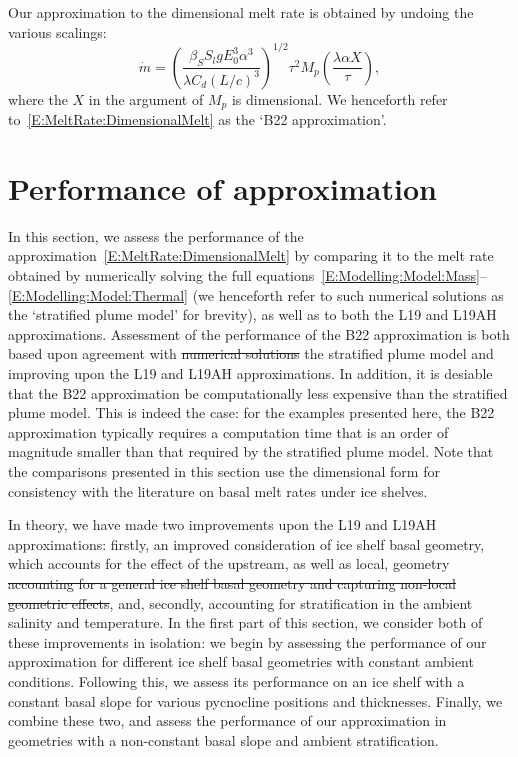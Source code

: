 \documentclass[openacc]{rsproca_new}%
\newcommand{\red}[1]{{\color{red} #1}}
\newcommand{\blue}[1]{{\color{blue} #1}}
\newcommand{\rout}[1]{\red{\st{#1}}}\newcommand{\ab}[1]{\textcolor{Green}{#1}}\newcommand{\about}[1]{\textcolor{Cyan}{\sout{#1}}}
\begin{document}
Our approximation to the dimensional melt rate is obtained by undoing the various scalings:
\begin{equation}\label{E:MeltRate:DimensionalMelt}
\dot{m} =\left(\frac{\beta_S S_l g  E_0^3 \alpha^3}{\lambda C_d (L/c)^3}\right)^{1/2} \tau^2  M_p\left(\frac{\lambda \alpha X}{\tau}\right),
\end{equation}
where the $X$ in the argument of $M_p$ is dimensional. We henceforth refer to~\eqref{E:MeltRate:DimensionalMelt} as the `B22 approximation'.

\section{Performance of approximation}\label{S:Numerics}
In this section, we assess the performance of the approximation~\eqref{E:MeltRate:DimensionalMelt} by comparing it to the melt rate obtained by numerically solving the full equations~\eqref{E:Modelling:Model:Mass}--\eqref{E:Modelling:Model:Thermal} \blue{(we henceforth refer to such numerical solutions as the `stratified plume model' for brevity)}, as well as to both the L19 and L19AH approximations. Assessment of the performance of the B22 approximation is both based upon agreement with \rout{numerical solutions }\blue{the stratified plume model} and improving upon the L19 and L19AH approximations. \blue{In addition, it is desiable that the B22 approximation be computationally less expensive than the stratified plume model. This is indeed the case: for the examples presented here, the B22 approximation typically requires a computation time that is an order of magnitude smaller than that required by the stratified plume model.} Note that the comparisons presented in this section use the dimensional form for consistency with the literature on basal melt rates under ice shelves.

In theory, we have made two improvements upon the L19 and L19AH approximations: firstly, \blue{an improved consideration of ice shelf basal geometry, which accounts for the effect of the upstream, as well as local, geometry}\rout{accounting for a general ice shelf basal geometry and capturing non-local geometric effects}, and, secondly, accounting for stratification in the ambient salinity and temperature. In the first part of this section, we consider both of these improvements in isolation: we begin by assessing the performance of our approximation for different ice shelf basal geometries with constant ambient conditions. Following this, we assess its performance on an ice shelf with a constant basal slope for various pycnocline positions \blue{and thicknesses}. Finally, we combine these two, and assess the performance of our approximation in geometries with a non-constant basal slope and ambient stratification.
\end{document}
